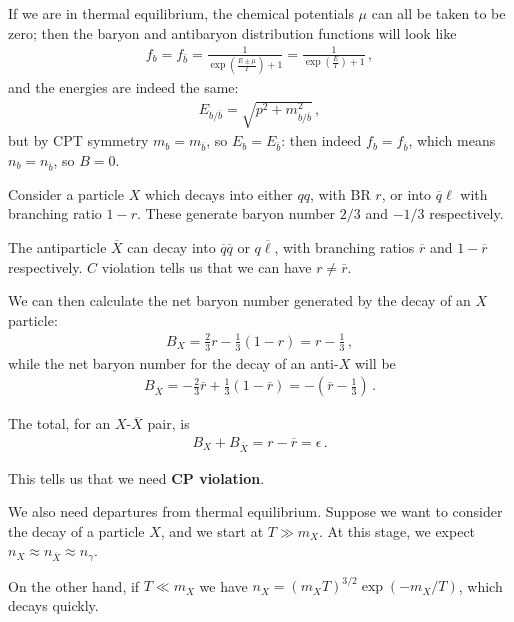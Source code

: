 \documentclass[main.tex]{subfiles}
\begin{document}
If we are in thermal equilibrium, the chemical potentials \(\mu \) can all be taken to be zero; then the baryon and antibaryon distribution functions will look like 
%
\begin{align}
f_b = f_{\overline{b}} = \frac{1}{\exp(\frac{E \pm \mu }{T}) + 1} = \frac{1}{\exp(\frac{E}{T}) + 1}
\,,
\end{align}
%
and the energies are indeed the same: 
%
\begin{align}
E_{b / \overline{b}} = \sqrt{p^2 + m_{b / \overline{b}}^2}
\,,
\end{align}
%
but by CPT symmetry \(m_b = m_{\overline{b}}\), so \(E_b = E_{\overline{b}}\): then indeed \(f_b = f_{\overline{b}}\), which means \(n_b = n_{\overline{b}}\), so \(B = 0\).

Consider a particle \(X\) which decays into either \(qq\), with BR \(r\), or into \(\overline{q} \ell\) with branching ratio \(1 - r\). 
These generate baryon number \(2/3\) and \(-1/3\) respectively.

The antiparticle \(\overline{X}\) can decay into \(\overline{q} \overline{q}\) or \(q \overline{\ell}\), with branching ratios \(\overline{r}\) and \(1 - \overline{r}\) respectively. 
\(C\) violation tells us that we can have \(r \neq \overline{r}\).

We can then calculate the net baryon number generated by the decay of an \(X\) particle: 
%
\begin{align}
B_X = \frac{2}{3} r - \frac{1}{3} (1 - r) = r - \frac{1}{3}
\,,
\end{align}
%
while the net baryon number for the decay of an anti-\(X\) will be 
%
\begin{align}
B_{\overline{X}} = -  \frac{2}{3} \overline{r} + \frac{1}{3} (1 - \overline{r}) = - (\overline{r} - \frac{1}{3})
\,.
\end{align}

The total, for an \(X\)-\(\overline{X}\) pair, is
%
\begin{align}
B_X + B_{\overline{X}} = r - \overline{r} = \epsilon 
\,.
\end{align}

This tells us that we need \textbf{CP violation}.

We also need departures from thermal equilibrium. 
Suppose we want to consider the decay of a particle \(X\), and we start at \(T \gg m_X\). 
At this stage, we expect \(n_X \approx n_{\overline{X}} \approx n_\gamma\). 

On the other hand, if \(T \ll m_X\) we have  \(n_X = (m_X T)^{3/2} \exp(- m_X / T)\), which decays quickly. 
\end{document}
